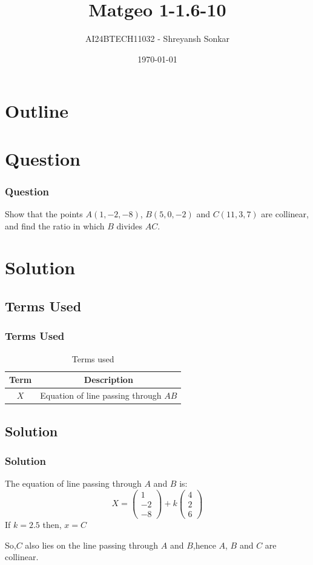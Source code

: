 \documentclass{beamer}
\title{Matgeo 1-1.6-10}
\author{AI24BTECH11032 - Shreyansh Sonkar}
\date{\today}
\providecommand{\brak}[1]{\ensuremath{\left(#1\right)}}
\theoremstyle{remark}
\numberwithin{equation}{section}
\begin{document}
\begin{frame}
\titlepage
\end{frame}

\section*{Outline}
\begin{frame}
\tableofcontents
\end{frame}

\section{Question}
\begin{frame}
\frametitle{Question}

Show that the points $A\brak{1, -2, -8}$, $B\brak{5,0,-2}$ and $C\brak{11,3,7}$ are collinear, and find the ratio in which $B$ divides $AC$.
\end{frame}

\section{Solution}
\subsection{Terms Used}
\begin{frame}
\frametitle{Terms Used}
\begin{table}[htbp]
    \centering
    \caption{Terms used}
    \label{tab:parameters}
    \begin{tabular}[12ptx]{ |c| c|}
    \hline\textbf{Term} & \textbf{Description}\\
    \hline
    $X$ & Equation of line passing through $AB$ \\
    \hline
    \end{tabular}
\end{table}
\end{frame}

\subsection{Solution}
\begin{frame}
\frametitle{Solution}

The equation of line passing through $A$ and $B$ is:
\begin{equation}
    X = \begin{pmatrix}
        1\\
        -2\\
        -8
    \end{pmatrix}+k\begin{pmatrix}
        4\\
        2\\
        6
    \end{pmatrix}
\end{equation}
If $k=2.5$ then, $x=C$

So,$C$ also lies on the line passing through $A$ and $B$,hence $A$, $B$ and $C$ are collinear. 
\end{frame}
\end{document}
